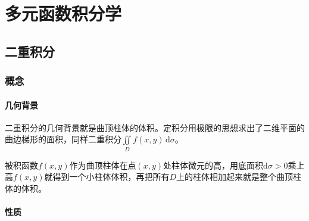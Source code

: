 \setcounter{tocdepth}{5}
\setcounter{secnumdepth}{5}
\renewcommand{\baselinestretch}{1.5}

\chapter{多元函数积分学}
\section{二重积分}

\subsection{概念}

\subsubsection{几何背景}

二重积分的几何背景就是曲顶柱体的体积。定积分用极限的思想求出了二维平面的曲边梯形的面积，同样二重积分$\iint\limits_Df(x,y)\,\textrm{d}\sigma$。

被积函数$f(x,y)$作为曲顶柱体在点$(x,y)$处柱体微元的高，用底面积$\textrm{d}\sigma>0$乘上高$f(x,y)$就得到一个小柱体体积，再把所有$D$上的柱体相加起来就是整个曲顶柱体的体积。

\subsubsection{性质}

